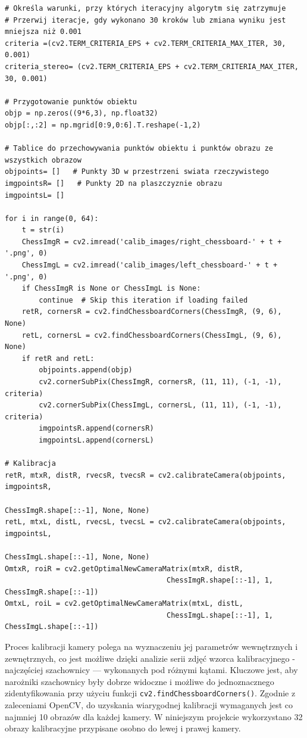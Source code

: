 \documentclass[magisterska]{pracadypl}
\begin{document}
\begin{lstlisting}[style=mypython]
# Określa warunki, przy których iteracyjny algorytm się zatrzymuje
# Przerwij iteracje, gdy wykonano 30 kroków lub zmiana wyniku jest mniejsza niż 0.001
criteria =(cv2.TERM_CRITERIA_EPS + cv2.TERM_CRITERIA_MAX_ITER, 30, 0.001)
criteria_stereo= (cv2.TERM_CRITERIA_EPS + cv2.TERM_CRITERIA_MAX_ITER, 30, 0.001)

# Przygotowanie punktów obiektu
objp = np.zeros((9*6,3), np.float32)
objp[:,:2] = np.mgrid[0:9,0:6].T.reshape(-1,2)

# Tablice do przechowywania punktów obiektu i punktów obrazu ze wszystkich obrazow
objpoints= []   # Punkty 3D w przestrzeni swiata rzeczywistego
imgpointsR= []   # Punkty 2D na plaszczyznie obrazu
imgpointsL= []

for i in range(0, 64):
    t = str(i)
    ChessImgR = cv2.imread('calib_images/right_chessboard-' + t + '.png', 0)
    ChessImgL = cv2.imread('calib_images/left_chessboard-' + t + '.png', 0)
    if ChessImgR is None or ChessImgL is None:
        continue  # Skip this iteration if loading failed
    retR, cornersR = cv2.findChessboardCorners(ChessImgR, (9, 6), None)
    retL, cornersL = cv2.findChessboardCorners(ChessImgL, (9, 6), None)
    if retR and retL:
        objpoints.append(objp)
        cv2.cornerSubPix(ChessImgR, cornersR, (11, 11), (-1, -1), criteria)
        cv2.cornerSubPix(ChessImgL, cornersL, (11, 11), (-1, -1), criteria)
        imgpointsR.append(cornersR)
        imgpointsL.append(cornersL)

# Kalibracja
retR, mtxR, distR, rvecsR, tvecsR = cv2.calibrateCamera(objpoints, imgpointsR,
                                                    ChessImgR.shape[::-1], None, None)
retL, mtxL, distL, rvecsL, tvecsL = cv2.calibrateCamera(objpoints, imgpointsL, 
                                                    ChessImgL.shape[::-1], None, None)
OmtxR, roiR = cv2.getOptimalNewCameraMatrix(mtxR, distR, 
                                      ChessImgR.shape[::-1], 1, ChessImgR.shape[::-1])
OmtxL, roiL = cv2.getOptimalNewCameraMatrix(mtxL, distL, 
                                      ChessImgL.shape[::-1], 1, ChessImgL.shape[::-1])
\end{lstlisting}

Proces kalibracji kamery polega na wyznaczeniu jej parametrów wewnętrznych i zewnętrznych, co jest możliwe dzięki analizie serii zdjęć wzorca kalibracyjnego - najczęściej szachownicy — wykonanych pod różnymi kątami. Kluczowe jest, aby narożniki szachownicy były dobrze widoczne i możliwe do jednoznacznego zidentyfikowania przy użyciu funkcji \texttt{cv2.findChessboardCorners()}. Zgodnie z zaleceniami OpenCV, do uzyskania wiarygodnej kalibracji wymaganych jest co najmniej 10 obrazów dla każdej kamery. W niniejszym projekcie wykorzystano 32 obrazy kalibracyjne przypisane osobno do lewej i prawej kamery.
\end{document}
